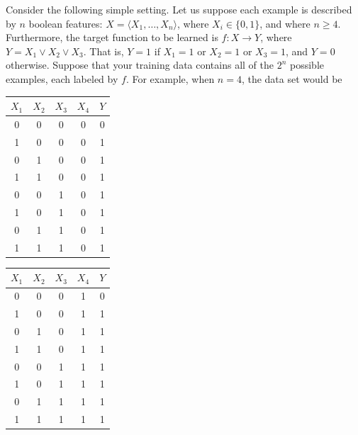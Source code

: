 \documentclass[11pt]{article}
\begin{document}
Consider the following simple setting. Let us suppose each example is described by $n$ boolean features: $X = \langle X_1, \ldots, X_n \rangle$, where $X_i \in \{0, 1\}$, and where $n \geq 4$. Furthermore, the target function to be learned is $f : X \rightarrow Y$, where $Y = X_1 \vee X_2 \vee X_3$. That is, $Y = 1$ if $X_1 = 1$ or $X_2 = 1$ or $X_3 = 1$, and $Y = 0$ otherwise. Suppose that your training data contains all of the $2^n$ possible examples, each labeled by $f$. For example, when $n = 4$, the data set would be
\begin{table}[H]
\centering
\begin{tabular}{cccc|c}
$X_1$ & $X_2$ & $X_3$ & $X_4$ & $Y$\\ \hline
0 & 0 & 0 & 0 & 0\\
1 & 0 & 0 & 0 & 1\\
0 & 1 & 0 & 0 & 1\\
1 & 1 & 0 & 0 & 1\\
0 & 0 & 1 & 0 & 1\\
1 & 0 & 1 & 0 & 1\\
0 & 1 & 1 & 0 & 1\\
1 & 1 & 1 & 0 & 1\\
\end{tabular}
\quad \quad \quad \quad
\begin{tabular}{cccc|c}
$X_1$ & $X_2$ & $X_3$ & $X_4$ & $Y$\\ \hline
0 & 0 & 0 & 1 & 0\\
1 & 0 & 0 & 1 & 1\\
0 & 1 & 0 & 1 & 1\\
1 & 1 & 0 & 1 & 1\\
0 & 0 & 1 & 1 & 1\\
1 & 0 & 1 & 1 & 1\\
0 & 1 & 1 & 1 & 1\\
1 & 1 & 1 & 1 & 1\\
\end{tabular} \label{table1}
\end{table}
\end{document}
